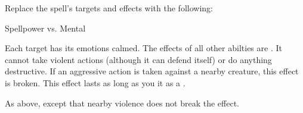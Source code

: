 Replace the spell's targets and effects with the following:
\begin{spellcontent}

\begin{augmenttargetinginfo}




\end{augmenttargetinginfo}


\begin{augmenteffects}




\begin{spellattack}{Spellpower vs. Mental}


\spellsuccess
Each target has its emotions calmed.
The effects of all other  abilties are .
It cannot take violent actions (although it can defend itself) or do anything destructive.
If an aggressive action is taken against a nearby creature, this effect is broken.
This effect lasts as long as you  it as a .



\spellcritical
As above, except that nearby violence does not break the effect.



\end{spellattack}





\end{augmenteffects}

\end{spellcontent}








